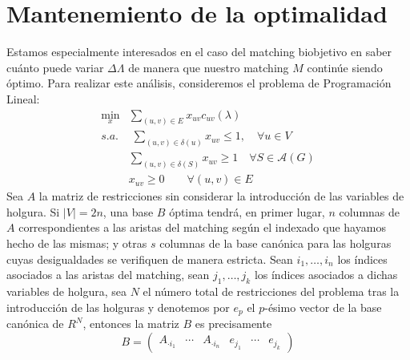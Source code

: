 \documentclass[twoside,a4paper,openright,12pt]{book}
\begin{document}
\section{Mantenemiento de la optimalidad}
Estamos especialmente interesados en el caso del matching biobjetivo en saber cuánto puede variar $\Delta \Lambda$ de manera que nuestro matching $M$ continúe siendo óptimo. Para realizar este análisis, consideremos el problema de Programación Lineal:
\begin{align*}
\min_x & \sum_{(u,v) \in E}x_{uv}c_{uv}(\lambda)\\
s.a.&\;\sum_{(u,v)\in\delta(u)} x_{uv} \leq 1, \quad \forall u \in V\\
&\sum_{(u,v)\in \delta(S)} x_{uv} \geq 1\quad \forall S \in \mathcal{A}(G)	\\
&x_{uv} \geq 0 \qquad \forall(u,v)\in E
\end{align*}
Sea $A$ la matriz de restricciones sin considerar la introducción de las variables de holgura. Si $|V|=2n$, una base $B$ óptima tendrá, en primer lugar, $n$ columnas de $A$ correspondientes a las aristas del matching según el indexado que hayamos hecho de las mismas; y otras $s$ columnas de la base canónica para las holguras cuyas desigualdades se verifiquen de manera estricta. Sean $i_1,\dotsc,i_n$ los índices asociados a las aristas del matching, sean $j_1,\dotsc,j_k$ los índices asociados a dichas variables de holgura, sea $N$ el número total de restricciones del problema tras la introducción de las holguras y denotemos por $e_p$ el $p$-ésimo vector de la base canónica de $R^N$, entonces la matriz $B$ es precisamente
$$ B= 
\begin{pmatrix}
A_{\cdot i_1} & \cdots & A_{\cdot i_n} & e_{j_1} & \cdots & e_{j_k}
\end{pmatrix}
$$
\newpage
\end{document}
